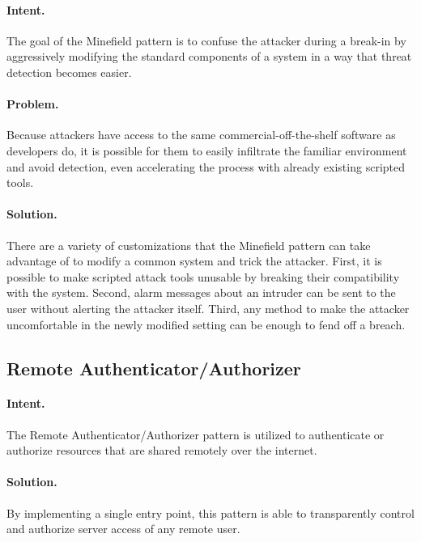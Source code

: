 \paragraph{\textbf{Intent.}} The goal of the Minefield pattern is to confuse the attacker during a break-in by aggressively modifying the standard components of a system in a way that threat detection becomes easier.

\paragraph{\textbf{Problem.}} Because attackers have access to the same commercial-off-the-shelf software as developers do, it is possible for them to easily infiltrate the familiar environment and avoid detection, even accelerating the process with already existing scripted tools.

\paragraph{\textbf{Solution.}} There are a variety of customizations that the Minefield pattern can take advantage of to modify a common system and trick the attacker. First, it is possible to make scripted attack tools unusable by breaking their compatibility with the system. Second, alarm messages about an intruder can be sent to the user without alerting the attacker itself. Third, any method to make the attacker uncomfortable in the newly modified setting can be enough to fend off a breach.


\subsection{Remote Authenticator/Authorizer~\cite{Ali2018}}
\label{p:rac} 

\paragraph{\textbf{Intent.}} The Remote Authenticator/Authorizer pattern is utilized to authenticate or authorize resources that are shared remotely over the internet.

\paragraph{\textbf{Solution.}} By implementing a single entry point, this pattern is able to transparently control and authorize server access of any remote user.



